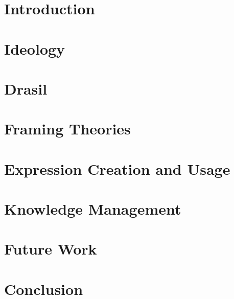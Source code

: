 \documentclass[12pt,oneside]{book}
\begin{document}

\mainmatter


\chapter{Introduction}
\label{chap:introduction}


\chapter{Ideology}
\label{chap:ideology}


\chapter{Drasil}
\label{chap:drasil}


\chapter{Framing Theories}
\label{chap:modelkinds}


\chapter{Expression Creation and Usage}
\label{chap:typedExpr}


\chapter{Knowledge Management}
\label{chap:knowledgeMgmt}


\chapter{Future Work}
\label{chap:futureWork}


\chapter{Conclusion}
\label{chap:conclusion}

\end{document}
